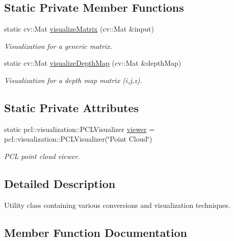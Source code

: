 \subsection*{Static Private Member Functions}
\begin{DoxyCompactItemize}
\item 
static cv\+::\+Mat \hyperlink{class_visualizer_a1ed923a0bdac0f3328af7aceb4d85e0e}{visualize\+Matrix} (cv\+::\+Mat \&input)
\begin{DoxyCompactList}\small\item\em Visualization for a generic matrix. \end{DoxyCompactList}\item 
static cv\+::\+Mat \hyperlink{class_visualizer_a5af40bebe3119c1d605351f42d2d8b95}{visualize\+Depth\+Map} (cv\+::\+Mat \&depth\+Map)
\begin{DoxyCompactList}\small\item\em Visualization for a depth map matrix (i,j,z). \end{DoxyCompactList}\end{DoxyCompactItemize}
\subsection*{Static Private Attributes}
\begin{DoxyCompactItemize}
\item 
static pcl\+::visualization\+::\+P\+C\+L\+Visualizer \hyperlink{class_visualizer_a82cad28f5c39579414f73bda01d11000}{viewer} = pcl\+::visualization\+::\+P\+C\+L\+Visualizer(\char`\"{}Point Cloud\char`\"{})
\begin{DoxyCompactList}\small\item\em P\+CL point cloud viewer. \end{DoxyCompactList}\end{DoxyCompactItemize}


\subsection{Detailed Description}
Utility class containing various conversions and visualization techniques. 

\subsection{Member Function Documentation}
\hypertarget{class_visualizer_af65e36aaef7c1f60d0f79819f17707d7}{}\label{class_visualizer_af65e36aaef7c1f60d0f79819f17707d7} 
